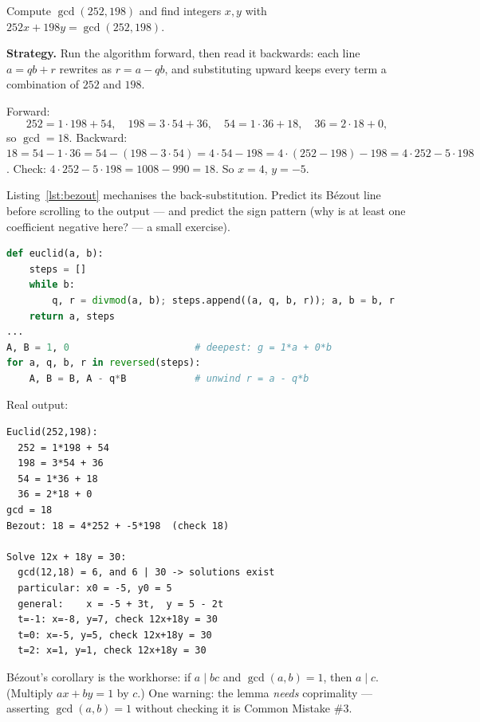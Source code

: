\begin{example}\label{ex:bezout}
Compute $\gcd(252, 198)$ and find integers $x, y$ with
$252x + 198y = \gcd(252,198)$.
\par\smallskip
\textbf{Strategy.} Run the algorithm forward, then read it backwards:
each line $a = qb + r$ rewrites as $r = a - qb$, and substituting upward
keeps every term a combination of $252$ and $198$.
\par\smallskip
\begin{solution}
Forward:
\[
252 = 1\cdot198 + 54,\quad
198 = 3\cdot54 + 36,\quad
54 = 1\cdot36 + 18,\quad
36 = 2\cdot18 + 0,
\]
so $\gcd = 18$. Backward:
$18 = 54 - 1\cdot36 = 54 - (198 - 3\cdot54) = 4\cdot54 - 198 =
4\cdot(252 - 198) - 198 = 4\cdot252 - 5\cdot198$.
Check: $4\cdot252 - 5\cdot198 = 1008 - 990 = 18$. So $x = 4$, $y = -5$.
\end{solution}
\end{example}

\begin{checkpoint}
Listing~\ref{lst:bezout} mechanises the back-substitution. Predict its
B\'ezout line before scrolling to the output --- and predict the sign
pattern (why is at least one coefficient negative here? --- a small exercise).
\end{checkpoint}

\begin{lstlisting}[language=Python,caption={\texttt{bezout.py}: Euclid
forward, then read backwards (full script in \texttt{code/bezout.py}).},
label={lst:bezout}]
def euclid(a, b):
    steps = []
    while b:
        q, r = divmod(a, b); steps.append((a, q, b, r)); a, b = b, r
    return a, steps
...
A, B = 1, 0                      # deepest: g = 1*a + 0*b
for a, q, b, r in reversed(steps):
    A, B = B, A - q*B            # unwind r = a - q*b
\end{lstlisting}
Real output:
\begin{lstlisting}[numbers=none]
Euclid(252,198):
  252 = 1*198 + 54
  198 = 3*54 + 36
  54 = 1*36 + 18
  36 = 2*18 + 0
gcd = 18
Bezout: 18 = 4*252 + -5*198  (check 18)

Solve 12x + 18y = 30:
  gcd(12,18) = 6, and 6 | 30 -> solutions exist
  particular: x0 = -5, y0 = 5
  general:    x = -5 + 3t,  y = 5 - 2t
  t=-1: x=-8, y=7, check 12x+18y = 30
  t=0: x=-5, y=5, check 12x+18y = 30
  t=2: x=1, y=1, check 12x+18y = 30
\end{lstlisting}

B\'ezout's corollary is the workhorse: if $a \mid bc$ and $\gcd(a,b) = 1$,
then $a \mid c$. (Multiply $ax + by = 1$ by $c$.) One warning: the lemma
\emph{needs} coprimality --- asserting $\gcd(a,b)=1$ without checking it is
Common Mistake \#3.

